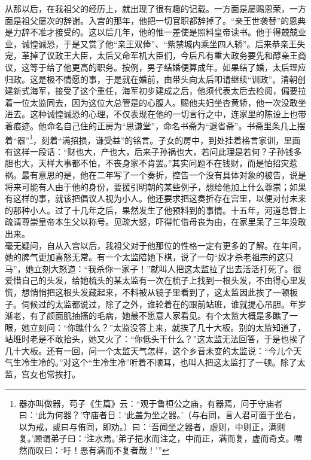 从那以后，在我祖父的经历上，就出现了很有趣的记载。一方面是屡赐恩荣，一方面是祖父屡次的辞谢。入宫的那年，他把一切官职都辞掉了。“亲王世袭替”的恩典是力辞不准才接受的。这以后几年，他的惟一差使是照料皇帝读书。他于得兢兢业业，诚惶诚恐，于是又赏了他“亲王双俸”、“紫禁城内乘坐四人轿”。后来恭亲王失宠，革掉了议政王大臣，太后又命军机大臣们，今后凡有重大政务要先和醇亲王商议，这等于给了他更高的职务。按例，男子结婚便算成年。如果结了婚，太后理应归政。这是极不情愿的事，于是就在婚前，由带头向太后叩请继续“训政”。清朝创建新式海军，接受了这个重任，海军初步建成之后，他须代表太后去检阅，偏要拉着一位太监同去，因为这位大总管是的心腹人。赐他夫妇坐杏黄轿，他一次没敢坐进去。这种诚惶诚恐的心理，不仅表现在他的一切言行之中，连家里的陈设上也带着痕迹。他命名自己住的正房为“思谦堂”，命名书斋为“退省斋”。书斋里条几上摆着“器”\footnote{器亦叫做器，苟子《生篇》云：“观于鲁桓公之庙，有器焉，问于守庙者曰：‘此为何器？’守庙者日：‘此盖为坐之器。’（与右同，言人君可置于坐右，以为戒，或曰与侑同，即劝。）曰：‘吾闻坐之器者，虚则，中则正，满则复。’顾谓弟子曰：‘注水焉。’弟子挹水而注之，中而正，满而复，虚而奇攴。喟然而叹曰：‘吁！恶有满而不复者哉！’”}，刻着“满招损，谦受益”的铭言。子女的房中，到处挂着格言家训，里面有这样一段话：“财也大，产也大，后来子孙祸也大，若问此理是若何？子孙钱多胆也大，天样大事都不怕，不丧身家不肯罢。”其实问题不在钱财，而是怕招灾惹祸。最有意思的是，他在二年写了一个奏折，控告一个没有具体对象的被告，说是将来可能有人由于他的身份，要援引明朝的某些例子，想给他加上什么尊崇；如果有这样的事，就该把倡议人视为小人。他还要求把这奏折存在宫里，以便对付未来的那种小人。过了十几年之后，果然发生了他预料到的事情。十五年，河道总督上疏请尊崇皇帝本生父以称号。见疏大怒，吓得忙借母丧为由，在家里呆了三年没敢出来。\\

毫无疑问，自从入宫以后，我祖父对于他那位的性格一定有更多的了解。在年间，她的脾气更加喜怒无常。有一个太监陪她下棋，说了一句“奴才杀老祖宗的这只马”，她立刻大怒道：“我杀你一家子！”就叫人把这太监拉了出去活活打死了。很爱惜自己的头发，给她梳头的某太监有一次在梳子上找到一根头发，不由得心里发慌，想悄悄把这根头发藏起来，不料被从镜子里看到了，这太监因此挨了一顿板子。伺候过的太监都说过，除了之外，谁轮着在的跟前站班，谁就提心吊胆。年岁渐老，有了颜面肌抽搐的毛病，她最不愿意人家看见。有个太监大概是多瞧了一眼，她立刻问：“你瞧什么？”太监没答上来，就挨了几十大板。别的太监知道了，站班时老是不敢抬头，她又火了：“你低头干什么？”这太监无法回答，于是也挨了几十大板。还有一回，问一个太监天气怎样，这个乡音未变的太监说：“今儿个天气生冷生冷的。”对这个“生冷生冷”听着不顺耳，也叫人把这太监打了一顿。除了太监，宫女也常挨打。\\

